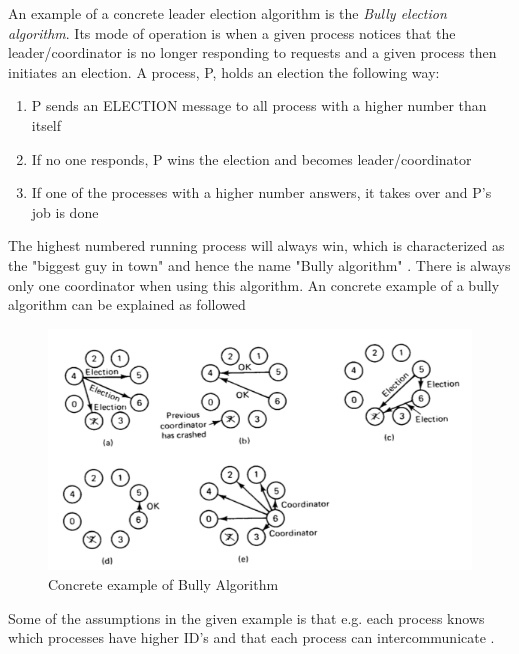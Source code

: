 \documentclass[Main]{subfiles}
\begin{document}
An example of a concrete leader election algorithm is the \textit{Bully election algorithm}. Its mode of operation is when a given process notices that the leader/coordinator is no longer responding to requests and a given process then initiates an election. A process, P,  holds an election the following way:
\begin{enumerate}
\item P sends an ELECTION message to all process with a higher number than itself
\item If no one responds, P wins the election and becomes leader/coordinator
\item If one of the processes with a higher number answers, it takes over and P's job is done 
\end{enumerate}

The highest numbered running process will always win, which is characterized as the "biggest guy in town" and hence the name "Bully algorithm" \cite{ElectionAlgorithm}. There is always only one coordinator when using this algorithm. An concrete example of a bully algorithm can be explained as followed

\begin{figure}[H]
\centering
\includegraphics[scale=0.8]{Figurer/BullyAlgorithm.png}
\caption{Concrete example of Bully Algorithm}
\end{figure}

Some of the assumptions in the given example is that e.g. each process knows which processes have higher ID's and that each process can intercommunicate \cite{RMI-slides}. 
\end{document}
